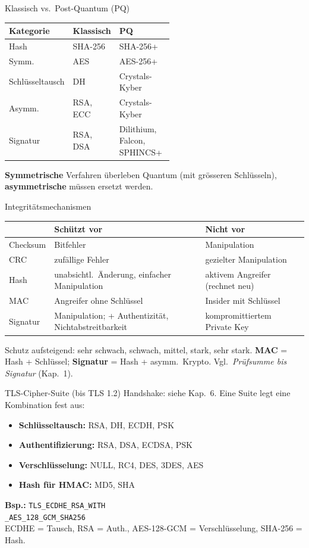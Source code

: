 \documentclass[a4paper, fontsize=7pt]{scrartcl}
\renewcommand*{\arraystretch}{1.5}  %
\begin{document}
\begin{mainbox}{Klassisch vs.\ Post-Quantum (PQ)}
\renewcommand*{\arraystretch}{1.15}
\setlength{\tabcolsep}{3pt}
\begin{tabularx}{\linewidth}{@{}>{\raggedright\arraybackslash}p{0.3\linewidth}|>{\raggedright\arraybackslash}p{0.25\linewidth}|>{\raggedright\arraybackslash}X@{}}
\textbf{Kategorie} & \textbf{Klassisch} & \textbf{PQ} \\
\hline
Hash & SHA-256 & SHA-256+ \\
Symm. & AES & AES-256+ \\
Schlüssel\-tausch & DH & Crystals-Kyber \\
Asymm. & RSA, ECC & Crystals-Kyber \\
Signatur & RSA, DSA & Dilithium, Falcon, SPHINCS+ \\
\end{tabularx}
\textbf{Symmetrische} Verfahren überleben Quantum (mit grösseren Schlüsseln),
\textbf{asymmetrische} müssen ersetzt werden.
\end{mainbox}

\begin{mainbox}{Integritätsmechanismen}
\renewcommand*{\arraystretch}{1.15}
\setlength{\tabcolsep}{3pt}
\begin{tabularx}{\linewidth}{@{}l|>{\raggedright\arraybackslash}X|>{\raggedright\arraybackslash}X@{}}
 & \textbf{Schützt vor} & \textbf{Nicht vor} \\
\hline
Checksum & Bitfehler & Manipulation \\
CRC & zufällige Fehler & gezielter Manipulation \\
Hash & unabsichtl.\ Änderung, einfacher Manipulation & aktivem Angreifer (rechnet
  neu) \\
MAC & Angreifer ohne Schlüssel & Insider mit Schlüssel \\
Signatur & Manipulation; + Authentizität, Nichtabstreitbarkeit &
  kompromit\-tiertem Private Key \\
\end{tabularx}
Schutz aufsteigend: sehr schwach, schwach, mittel, stark, sehr stark.
\textbf{MAC} = Hash + Schlüssel; \textbf{Signatur} = Hash + asymm.\ Krypto.
Vgl.\ \emph{Prüfsumme bis Signatur} (Kap.\ 1).
\end{mainbox}

\begin{mainbox}{TLS-Cipher-Suite (bis TLS 1.2)}
Handshake: siehe Kap.\ 6. Eine Suite legt eine Kombination fest aus:
\begin{itemize}
    \item \textbf{Schlüsseltausch:} RSA, DH, ECDH, PSK
    \item \textbf{Authentifizierung:} RSA, DSA, ECDSA, PSK
    \item \textbf{Verschlüsselung:} NULL, RC4, DES, 3DES, AES
    \item \textbf{Hash für HMAC:} MD5, SHA
\end{itemize}
\textbf{Bsp.:} \texttt{TLS\_ECDHE\_RSA\_WITH}\\
\texttt{\_AES\_128\_GCM\_SHA256}\\
ECDHE = Tausch, RSA = Auth., AES-128-GCM = Verschlüsselung, SHA-256 = Hash.
\end{mainbox}
\end{document}

